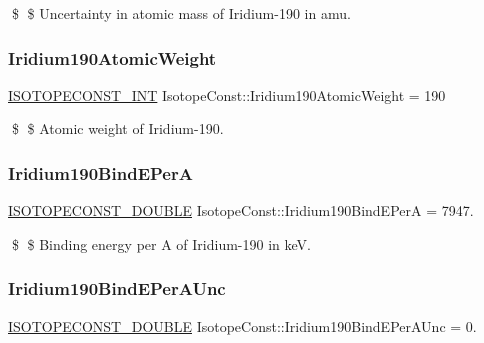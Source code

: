 \$ \$ Uncertainty in atomic mass of Iridium-\/190 in amu. \mbox{\label{group___isotope_const-_iridium-_ir190_gacae3f555c210012e6c58b6696a37f4e9}} 
\subsubsection{\texorpdfstring{Iridium190\+Atomic\+Weight}{Iridium190AtomicWeight}}
{\footnotesize\ttfamily \mbox{\hyperlink{group___isotope_const-_macros_ga5f18360b3e99483a35c32d789e62621c}{I\+S\+O\+T\+O\+P\+E\+C\+O\+N\+S\+T\+\_\+\+I\+NT}} Isotope\+Const\+::\+Iridium190\+Atomic\+Weight = 190}

\$ \$ Atomic weight of Iridium-\/190. \mbox{\label{group___isotope_const-_iridium-_ir190_gab7960c24f4b07661e1a6dba7616b4f54}} 
\subsubsection{\texorpdfstring{Iridium190\+Bind\+E\+PerA}{Iridium190BindEPerA}}
{\footnotesize\ttfamily \mbox{\hyperlink{group___isotope_const-_macros_ga8f45a7272ce02c0b4c65c44636ed719a}{I\+S\+O\+T\+O\+P\+E\+C\+O\+N\+S\+T\+\_\+\+D\+O\+U\+B\+LE}} Isotope\+Const\+::\+Iridium190\+Bind\+E\+PerA = 7947.}

\$ \$ Binding energy per A of Iridium-\/190 in keV. \mbox{\label{group___isotope_const-_iridium-_ir190_ga6e22a2b3c7af4bf1763395a1081cf99c}} 
\subsubsection{\texorpdfstring{Iridium190\+Bind\+E\+Per\+A\+Unc}{Iridium190BindEPerAUnc}}
{\footnotesize\ttfamily \mbox{\hyperlink{group___isotope_const-_macros_ga8f45a7272ce02c0b4c65c44636ed719a}{I\+S\+O\+T\+O\+P\+E\+C\+O\+N\+S\+T\+\_\+\+D\+O\+U\+B\+LE}} Isotope\+Const\+::\+Iridium190\+Bind\+E\+Per\+A\+Unc = 0.}

